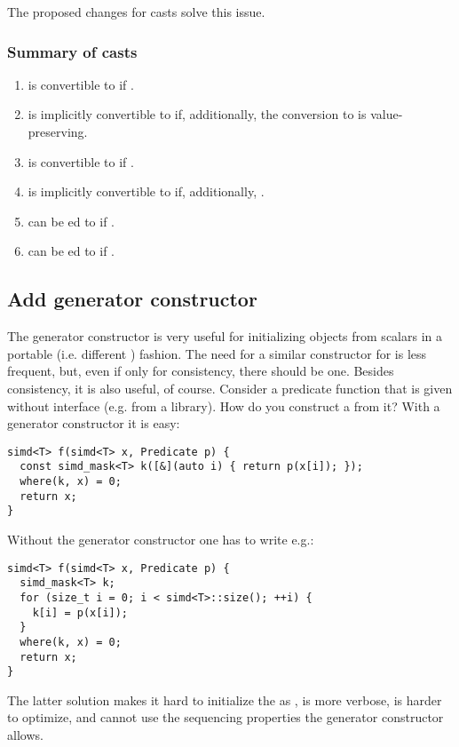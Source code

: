 The proposed changes for casts solve this issue.

\subsubsection{Summary of casts}

\begin{enumerate}
  \item {} is convertible to  if
    .

  \item {} is implicitly convertible to 
    if, additionally, the conversion  to  is
    value-preserving.

  \item {} is convertible to  if
    .

  \item {} is implicitly convertible to
     if, additionally, .

  \item {} can be ed to  if
    .

  \item {} can be ed to  if
    .
\end{enumerate}

\subsection{Add  generator constructor}
The  generator constructor is very useful for initializing objects
from scalars in a portable (i.e. different ) fashion.
The need for a similar constructor for  is less frequent, but,
even if only for consistency, there should be one.
Besides consistency, it is also useful, of course.
Consider a predicate function that is given without  interface (e.g. from a library).
How do you construct a  from it?
With a generator constructor it is easy:
\medskip\begin{lstlisting}[style=Vc]
simd<T> f(simd<T> x, Predicate p) {
  const simd_mask<T> k([&](auto i) { return p(x[i]); });
  where(k, x) = 0;
  return x;
}
\end{lstlisting}
Without the generator constructor one has to write e.g.:
\medskip\begin{lstlisting}[style=Vc]
simd<T> f(simd<T> x, Predicate p) {
  simd_mask<T> k;
  for (size_t i = 0; i < simd<T>::size(); ++i) {
    k[i] = p(x[i]);
  }
  where(k, x) = 0;
  return x;
}
\end{lstlisting}
The latter solution makes it hard to initialize the  as , is more verbose, is harder to optimize, and cannot use the sequencing properties the generator constructor allows.

